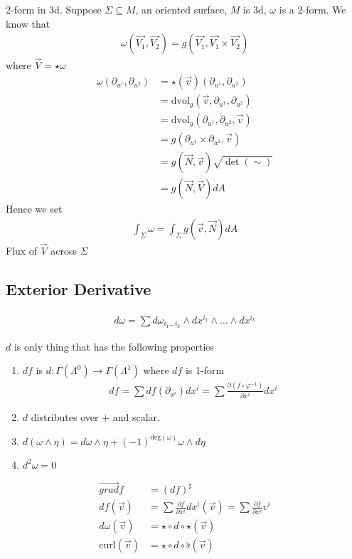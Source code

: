 \documentclass[10pt]{amsart}
\newcommand{\p}{\partial}
\newcommand{\px}[1]{\partial_{x^{#1}}}
\newcommand{\ra}{\rightarrow}
\newcommand{\dvol}{\text{dvol}_g}
\newcommand{\vp}{\varphi}
\renewcommand{\o}{\circ}
\renewcommand{\i}{^{-1}}
\renewcommand{\*}{\star}
\newcommand{\pder}[2]{\frac{\partial #1}{\partial #2}}
\begin{document}
2-form in 3d. Suppose $\Sigma\subseteq M$, an oriented surface, $M$ is 3d,
$\omega$ is a 2-form. We know that
\begin{align*}
  \omega(\vec{V_1},\vec{V_2})=g(\vec{V_1},\vec{V_1}\times\vec{V_2})
\end{align*}
where $\vec{V}=\*\omega$
\begin{align*}
  \omega(\p_{u^1},\p_{u^2})&=\*(\vec{v})(\p_{u^1},\p_{u^2})\\
                           &=\dvol(\vec{v}, \p_{u^1},\p_{u^2})\\
                           &=\dvol(\p_{u^1},\p_{u^2},\vec{v})\\
                           &=g(\p_{u^1}\times\p_{u^2},\vec{v})\\
                           &=g(\vec{N},\vec{v})\sqrt{\det(\sim)}\\
                           &=g(\vec{N},\vec{V})dA
\end{align*}
Hence we set
\begin{align*}
  \int_\Sigma\omega=\int_\Sigma g(\vec{v},\vec{N})dA
\end{align*}
Flux of $\vec{V}$ across $\Sigma$

\subsection{Exterior Derivative}%
\label{sub:exterior_derivative}

\begin{align*}
  d\omega=\sum d\omega_{i_1\ldots i_k}\wedge dx^{i_1}\wedge\ldots\wedge dx^{i_k}
\end{align*}

$d$ is only thing that has the following properties
\begin{enumerate}
  \item $df$ is $d:\Gamma(\Lambda^0)\ra\Gamma(\Lambda^1)$ where $df$ is 1-form
    \begin{align*}
      df=\sum df(\px{i})dx^i=\sum\pder{(f\o\vp\i)}{x^i}dx^i
    \end{align*}
  \item $d$ distributes over $+$ and scalar.
  \item
    $d(\omega\wedge\eta)=d\omega\wedge\eta+(-1)^{\text{deg}(\omega)}\omega\wedge
    d\eta$
  \item $d^2\omega=0$
\end{enumerate}

\begin{align*}
  \vec{grad}f&=(df)^\sharp\\
  df(\vec{v})&=\sum\pder{f}{x^i}dx^i(\vec{v})=\sum\pder{f}{x^i}v^i\\
  d\omega(\vec{v})&=\*\o d\o\*(\vec{v})\\
  \text{curl}(\vec{v})&=\*\o d\o\flat(\vec{v})
\end{align*}
\end{document}
